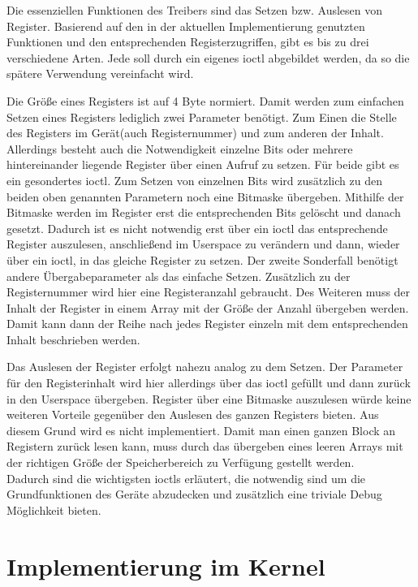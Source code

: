 Die essenziellen Funktionen des Treibers sind das Setzen bzw. Auslesen von Register. Basierend auf den in der aktuellen Implementierung genutzten Funktionen und den entsprechenden Registerzugriffen, gibt es bis zu drei verschiedene Arten. Jede soll durch ein eigenes \ac{ioctl} abgebildet werden, da so die spätere Verwendung vereinfacht wird.  


Die Größe eines Registers ist auf 4 Byte normiert. Damit werden zum einfachen Setzen eines Registers lediglich zwei Parameter benötigt. Zum Einen die Stelle des Registers im Gerät(auch Registernummer) und zum anderen der Inhalt. 
Allerdings besteht auch die Notwendigkeit einzelne Bits oder mehrere hintereinander liegende Register über einen Aufruf zu setzen. Für beide gibt es ein gesondertes \ac{ioctl}. Zum Setzen von einzelnen Bits wird zusätzlich zu den beiden oben genannten Parametern noch eine Bitmaske übergeben. Mithilfe der Bitmaske werden im Register erst die entsprechenden Bits gelöscht und danach gesetzt. Dadurch ist es nicht notwendig erst über ein \ac{ioctl} das entsprechende Register auszulesen, anschließend im Userspace zu verändern und dann, wieder über ein \ac{ioctl}, in das gleiche Register zu setzen.
Der zweite Sonderfall benötigt andere Übergabeparameter als das einfache Setzen. Zusätzlich zu der Registernummer wird hier eine Registeranzahl gebraucht. Des Weiteren muss der Inhalt der Register in einem Array mit der Größe der Anzahl übergeben werden. Damit kann dann der Reihe nach jedes Register einzeln mit dem entsprechenden Inhalt beschrieben werden.


Das Auslesen der Register erfolgt nahezu analog zu dem Setzen. Der Parameter für den Registerinhalt wird hier allerdings über das \ac{ioctl} gefüllt und dann zurück in den Userspace übergeben. 
Register über eine Bitmaske auszulesen würde keine weiteren Vorteile gegenüber den Auslesen des ganzen Registers bieten. Aus diesem Grund wird es nicht implementiert.  
Damit man einen ganzen Block an Registern zurück lesen kann, muss durch das übergeben eines leeren Arrays mit der richtigen Größe der Speicherbereich zu Verfügung gestellt werden.\\

Dadurch sind die wichtigsten \ac{ioctl}s erläutert, die notwendig sind um die Grundfunktionen des Geräte abzudecken und zusätzlich eine triviale Debug Möglichkeit bieten.

\section{Implementierung im Kernel}\label{sec:kernel}


